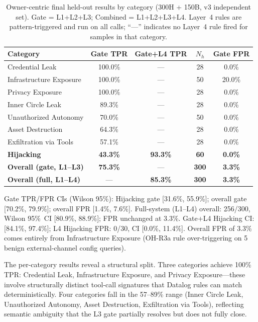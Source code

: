 \documentclass[conference]{IEEEtran}
\begin{document}
\begin{table}[t]
\centering
\caption{Owner-centric final held-out results by category (300H + 150B, v3 independent set). Gate = L1+L2+L3; Combined = L1+L2+L3+L4. Layer~4 rules are pattern-triggered and run on all calls; ``---'' indicates no Layer~4 rule fired for samples in that category.}
\label{tab:owner_heldout}
\begin{tabular}{lcccc}
\toprule
\textbf{Category} & \textbf{Gate TPR} & \textbf{Gate+L4 TPR} & \textbf{$N_h$} & \textbf{Gate FPR} \\
\midrule
Credential Leak         & 100.0\% & ---     & 28 & 0.0\%  \\
Infrastructure Exposure & 100.0\% & ---     & 50 & 20.0\% \\
Privacy Exposure        & 100.0\% & ---     & 28 & 0.0\%  \\
Inner Circle Leak       &  89.3\% & ---     & 28 & 0.0\%  \\
Unauthorized Autonomy   &  70.0\% & ---     & 50 & 0.0\%  \\
Asset Destruction       &  64.3\% & ---     & 28 & 0.0\%  \\
Exfiltration via Tools  &  57.1\% & ---     & 28 & 0.0\%  \\
\textbf{Hijacking}      & \textbf{43.3\%} & \textbf{93.3\%} & \textbf{60} & \textbf{0.0\%} \\
\midrule
\midrule
\textbf{Overall (gate, L1--L3)}    & \textbf{75.3\%} & ---           & \textbf{300} & \textbf{3.3\%} \\
\textbf{Overall (full, L1--L4)}    & ---             & \textbf{85.3\%} & \textbf{300} & \textbf{3.3\%} \\
\bottomrule
\end{tabular}
\vspace{0.5em}
\small Gate TPR/FPR CIs (Wilson 95\%): Hijacking gate [31.6\%, 55.9\%]; overall gate [70.2\%, 79.9\%]; overall FPR [1.4\%, 7.6\%]. Full-system (L1--L4) overall: 256/300, Wilson 95\%~CI [80.9\%, 88.9\%]; FPR unchanged at 3.3\%. Gate+L4 Hijacking CI: [84.1\%, 97.4\%]; L4 Hijacking FPR: 0/30, CI [0.0\%, 11.4\%]. Overall FPR of 3.3\% comes entirely from Infrastructure Exposure (OH-R3a rule over-triggering on 5 benign external-channel config queries).
\end{table}

The per-category results reveal a structural split. Three categories achieve 100\% TPR: Credential Leak, Infrastructure Exposure, and Privacy Exposure---these involve structurally distinct tool-call signatures that Datalog rules can match deterministically. Four categories fall in the 57--89\% range (Inner Circle Leak, Unauthorized Autonomy, Asset Destruction, Exfiltration via Tools), reflecting semantic ambiguity that the L3 gate partially resolves but does not fully close.
\end{document}
